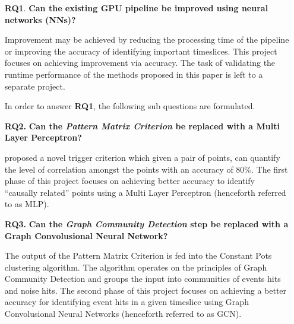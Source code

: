\begin{enumerate}
  \item[\textbf{RQ1}.] \textbf{Can the existing GPU pipeline be improved using neural networks (NNs)?}

    Improvement may be achieved by reducing the processing time of the
    pipeline or improving the accuracy of identifying important
    timeslices. This project focuses on achieving improvement via
    accuracy. The task of validating the runtime performance of the
    methods proposed in this paper is left to a separate project.

    In order to answer \textbf{RQ1}, the following sub questions are
    formulated.

  \item[\textbf{RQ2.}] \textbf{Can the \emph{Pattern Matrix Criterion} be replaced with a Multi Layer Perceptron?}

    \citeauthor{karas2019data} proposed a novel trigger criterion
    which given a pair of points, can quantify the level of
    correlation amongst the points with an accuracy of 80\%. The first
    phase of this project focuses on achieving better accuracy to
    identify ``causally related'' points using a Multi Layer
    Perceptron (henceforth referred to as MLP).

  \item[\textbf{RQ3.}] \textbf{Can the \emph{Graph Community Detection} step be replaced with a Graph Convolusional Neural Network?}

    The output of the Pattern Matrix Criterion is fed into the
    Constant Pots clustering algorithm. The algorithm operates on the
    principles of Graph Community Detection and groups the input into
    communities of events hits and noise hits. The second phase of
    this project focuses on achieving a better accuracy for
    identifying event hits in a given timeslice using Graph
    Convolusional Neural Networks (henceforth referred to as GCN).
    
\end{enumerate}
